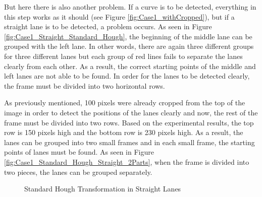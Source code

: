 But here there is also another problem. If a curve is to be detected, everything in this step works as it should (see Figure \ref{fig:Case1_withCropped}), but if a straight lane is to be detected, a problem occurs. As seen in Figure \ref{fig:Case1_Straight_Standard_Hough}, the beginning of the middle lane can be grouped with the left lane. In other words, there are again three different groups for three different lanes but each group of red lines fails to separate the lanes clearly from each other. As a result, the correct starting points of the middle and left lanes are not able to be found. In order for the lanes to be detected clearly, the frame must be divided into two horizontal rows.

As previously mentioned, 100 pixels were already cropped from the top of the image in order to detect the positions of the lanes clearly and now, the rest of the frame must be divided into two rows. Based on the experimental results, the top row is 150 pixels high and the bottom row is 230 pixels high. As a result, the lanes can be grouped into two small frames and in each small frame, the starting points of lanes must be found. As seen in Figure \ref{fig:Case1_Standard_Hough_Straight_2Parts}, when the frame is divided into two pieces, the lanes can be grouped separately.

\begin{figure}[H]
  \centering
  \hfill
  \caption{Standard Hough Transformation in Straight Lanes}
\end{figure} 


